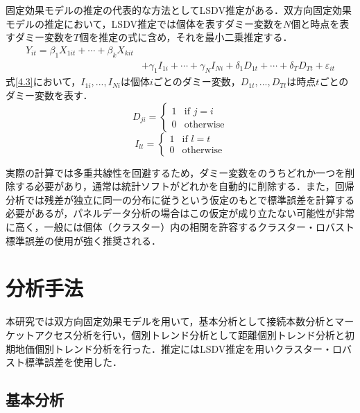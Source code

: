 固定効果モデルの推定の代表的な方法としてLSDV推定がある．双方向固定効果モデルの推定において，LSDV推定では個体を表すダミー変数を$N$個と時点を表すダミー変数を$T$個を推定の式に含め，それを最小二乗推定する．
\begin{equation}
  \begin{aligned}
    Y_{it} = \beta_{1}X_{1it} + \cdots  + \beta_{k}X_{kit} \\
    &+ \gamma_{1}I_{1i} + \cdots + \gamma_{N}I_{Ni} + \delta_{1}D_{1t} + \cdots + \delta_{T}D_{Tt} + \varepsilon_{it}
  \end{aligned}
  \label{4.3} 
\end{equation}
式\ref{4.3}において，$I_{1i},...,I_{Ni}$は個体$i$ごとのダミー変数，$D_{1t},...,D_{Tt}$は時点$t$ごとのダミー変数を表す．
\begin{equation}
  D_{ji} =
  \begin{cases}
    1 & \text{if } j = i \\
    0 & \text{otherwise}
  \end{cases}
\end{equation}
\begin{equation}
  I_{lt} =
  \begin{cases}
    1 & \text{if } l = t \\
    0 & \text{otherwise}
  \end{cases}
\end{equation}

実際の計算では多重共線性を回避するため，ダミー変数をのうちどれか一つを削除する必要があり，通常は統計ソフトがどれかを自動的に削除する．また，回帰分析では残差が独立に同一の分布に従うという仮定のもとで標準誤差を計算する必要があるが，パネルデータ分析の場合はこの仮定が成り立たない可能性が非常に高く，一般には個体（クラスター）内の相関を許容するクラスター・ロバスト標準誤差の使用が強く推奨される．

\section{分析手法}
本研究では双方向固定効果モデルを用いて，基本分析として接続本数分析とマーケットアクセス分析を行い，個別トレンド分析として距離個別トレンド分析と初期地価個別トレンド分析を行った．推定にはLSDV推定を用いクラスター・ロバスト標準誤差を使用した．
\subsection{基本分析}

